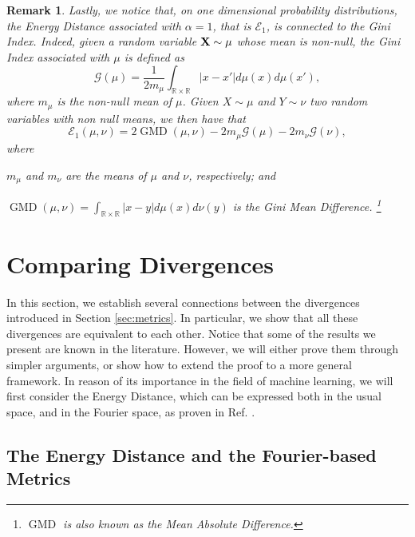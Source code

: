 \documentclass{article}
\def\bX{{\bf X}}
\DeclareMathOperator{\GMD}{GMD}
\def \erre{\mathbb{R}}
\newtheorem{remark}{Remark}
\begin{document}
\begin{remark}
    Lastly, we notice that, on one dimensional probability distributions, the Energy Distance associated with $\alpha=1$, that is $\mathcal{E}_1$, is connected to the Gini Index.\cite{Gini1,Gini2}
    Indeed, given a random variable $\bX\sim\mu$ whose mean is non-null, the Gini Index associated with $\mu$ is defined as
    \begin{equation}
        \label{eq:def_gini}
        \mathcal{G}(\mu)=\frac{1}{2m_\mu}\int_{\erre\times\erre}|x-x'|d\mu(x)d\mu(x'),
    \end{equation}
    where $m_\mu$ is the non-null mean of $\mu$.
    Given $X\sim\mu$ and $Y\sim\nu$ two random variables with non null means, we then have that
    \begin{equation}
        \label{eq:energy:to_gini}
        \mathcal{E}_1(\mu,\nu)=2\GMD(\mu,\nu)-2m_\mu\mathcal{G}(\mu)-2m_\nu\mathcal{G}(\nu),
    \end{equation}
    where \begin{enumerate*}
        \item $m_\mu$ and $m_\nu$ are the means of $\mu$ and $\nu$, respectively; and
        \item $\GMD(\mu,\nu)=\int_{\erre\times\erre}|x-y|d\mu(x)d\nu(y)$ is the Gini Mean Difference. \footnote{$\GMD$ is also known as the Mean Absolute Difference.}
    \end{enumerate*}  
\end{remark}





\section{Comparing Divergences}


In this section, we establish several connections between the divergences introduced in Section \ref{sec:metrics}.  
%
In particular, we show that all these divergences are equivalent to each other.
% 
Notice that some of the results we present are known in the literature.
% 
However, we will either prove them through simpler arguments, or show how to extend the proof to a more general framework.
% 
In reason of its importance in the field of machine learning, we will first consider the Energy Distance, which can be expressed both in the usual space, and in the Fourier space, as proven in Ref. \cite{SR}.  


\subsection{The Energy Distance and the Fourier-based Metrics}
\label{sec:fourierandenergy}
\end{document}
